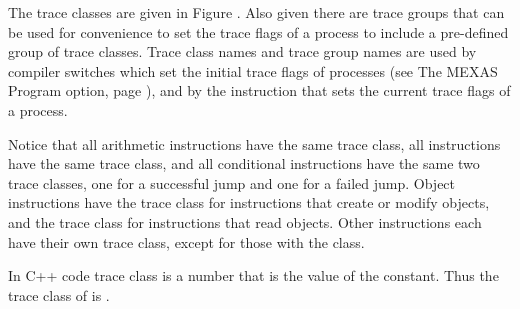 \documentclass[12pt]{article}
\begin{document}
The trace classes are given in Figure .
Also given there are trace groups that can be used for convenience
to set the trace flags of a process to include
a pre-defined group of trace classes.
Trace class names and trace group names are used by compiler switches
which set the initial trace flags of processes
(see The MEXAS Program  option, page ),
and by the
 instruction that sets the current trace flags
of a process.

Notice that all arithmetic instructions have the same
trace class, all  instructions have the same trace
class, and all conditional  instructions have the
same two trace classes, one for a successful jump and one for
a failed jump.  Object instructions have the  trace class for
instructions that create or modify objects, and the  trace
class for instructions that read objects.
Other instructions each have their own trace class,
except for those with the  class.

In C++ code trace class  is a number that is the value of
the  constant.  Thus the trace class of 
is .
\end{document}
